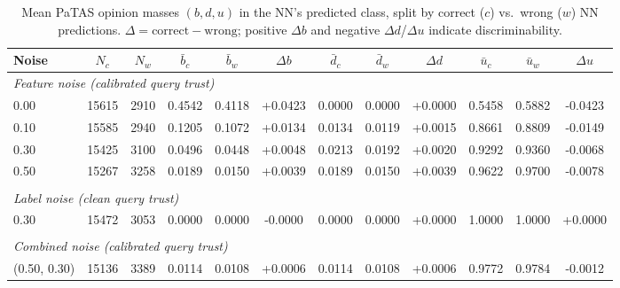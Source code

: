\begin{table}[ht]
\centering
\caption{Mean PaTAS opinion masses $(b, d, u)$ in the NN's predicted class, split by correct ($c$) vs.\ wrong ($w$) NN predictions. $\Delta = \text{correct} - \text{wrong}$; positive $\Delta b$ and negative $\Delta d$/$\Delta u$ indicate discriminability.}
\label{tab:ptas-effectiveness}
\begin{tabular}{lccccccccccc}
\toprule
Noise & $N_c$ & $N_w$ & $\bar{b}_c$ & $\bar{b}_w$ & $\Delta b$ & $\bar{d}_c$ & $\bar{d}_w$ & $\Delta d$ & $\bar{u}_c$ & $\bar{u}_w$ & $\Delta u$ \\
\midrule
\multicolumn{12}{l}{\textit{Feature noise (calibrated query trust)}} \\
0.00 & 15615 & 2910 & 0.4542 & 0.4118 & +0.0423 & 0.0000 & 0.0000 & +0.0000 & 0.5458 & 0.5882 & -0.0423 \\
0.10 & 15585 & 2940 & 0.1205 & 0.1072 & +0.0134 & 0.0134 & 0.0119 & +0.0015 & 0.8661 & 0.8809 & -0.0149 \\
0.30 & 15425 & 3100 & 0.0496 & 0.0448 & +0.0048 & 0.0213 & 0.0192 & +0.0020 & 0.9292 & 0.9360 & -0.0068 \\
0.50 & 15267 & 3258 & 0.0189 & 0.0150 & +0.0039 & 0.0189 & 0.0150 & +0.0039 & 0.9622 & 0.9700 & -0.0078 \\
\midrule \\
\multicolumn{12}{l}{\textit{Label noise (clean query trust)}} \\
0.30 & 15472 & 3053 & 0.0000 & 0.0000 & -0.0000 & 0.0000 & 0.0000 & +0.0000 & 1.0000 & 1.0000 & +0.0000 \\
\midrule \\
\multicolumn{12}{l}{\textit{Combined noise (calibrated query trust)}} \\
(0.50, 0.30) & 15136 & 3389 & 0.0114 & 0.0108 & +0.0006 & 0.0114 & 0.0108 & +0.0006 & 0.9772 & 0.9784 & -0.0012 \\
\bottomrule
\end{tabular}
\end{table}